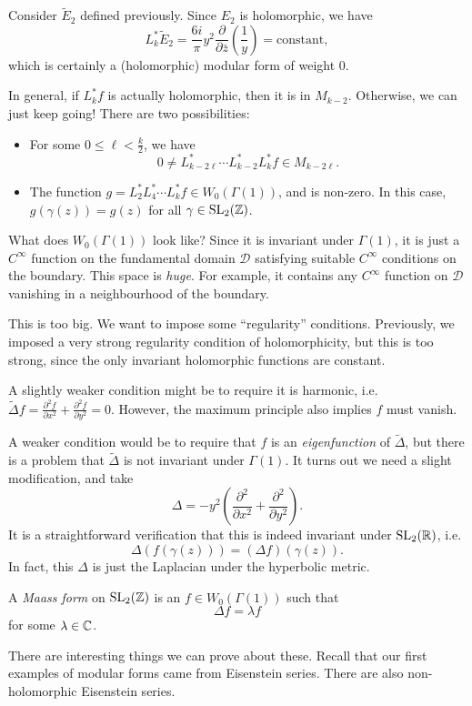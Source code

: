 \documentclass[a4paper]{article}
\begin{document}
\begin{eg}
  Consider $\tilde{E}_2$ defined previously. Since $E_2$ is holomorphic, we have
  \[
    L_k^* \tilde{E}_2 = \frac{6i}{\pi} y^2 \frac{\partial}{\partial \bar{z}}\left(\frac{1}{y}\right) = \text{constant},
  \]
  which is certainly a (holomorphic) modular form of weight $0$.
\end{eg}

In general, if $L_k^* f$ is actually holomorphic, then it is in $M_{k - 2}$. Otherwise, we can just keep going! There are two possibilities:
\begin{itemize}
  \item For some $0 \leq \ell < \frac{k}{2}$, we have
    \[
      0 \not= L_{k - 2\ell}^* \cdots L_{k - 2}^* L_k^* f \in M_{k - 2\ell}.
    \]
  \item The function $g = L_2^* L_4^* \cdots L_k^* f \in W_0(\Gamma(1))$, and is non-zero. In this case, $g(\gamma(z)) = g(z)$ for all $\gamma \in \mathrm{SL}_2(\mathbb{Z})$.
\end{itemize}
What does $W_0(\Gamma(1))$ look like? Since it is invariant under $\Gamma(1)$, it is just a $C^\infty$ function on the fundamental domain $\mathcal{D}$ satisfying suitable $C^\infty$ conditions on the boundary. This space is \emph{huge}. For example, it contains any $C^\infty$ function on $\mathcal{D}$ vanishing in a neighbourhood of the boundary.

This is too big. We want to impose some ``regularity'' conditions. Previously, we imposed a very strong regularity condition of holomorphicity, but this is too strong, since the only invariant holomorphic functions are constant.

A slightly weaker condition might be to require it is harmonic, i.e.\ $\tilde{\Delta} f = \frac{\partial^2 f}{\partial x^2} + \frac{\partial^2 f}{\partial y^2} = 0$. However, the maximum principle also implies $f$ must vanish.

A weaker condition would be to require that $f$ is an \emph{eigenfunction} of $\tilde{\Delta}$, but there is a problem that $\tilde{\Delta}$ is not invariant under $\Gamma(1)$. It turns out we need a slight modification, and take
\[
  \Delta = - y^2 \left(\frac{\partial^2}{\partial x^2} + \frac{\partial^2}{\partial y^2}\right).
\]
It is a straightforward verification that this is indeed invariant under $\mathrm{SL}_2(\mathbb{R})$, i.e.
\[
  \Delta (f(\gamma(z))) = (\Delta f)(\gamma(z)).
\]
In fact, this $\Delta$ is just the Laplacian under the hyperbolic metric.

\begin{defi}
  A \emph{Maass form} on $\mathrm{SL}_2(\mathbb{Z})$ is an $f \in W_0(\Gamma(1))$ such that
  \[
    \Delta f = \lambda f
  \]
  for some $\lambda \in \mathbb{C}$.
\end{defi}
There are interesting things we can prove about these. Recall that our first examples of modular forms came from Eisenstein series. There are also non-holomorphic Eisenstein series.
\end{document}
